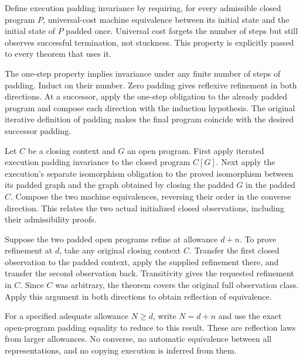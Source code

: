 Define execution padding invariance by requiring, for every admissible closed
program $P$, universal-cost machine equivalence between its initial state and
the initial state of $P$ padded once. Universal cost forgets the number of
steps but still observes successful termination, not stuckness. This property
is explicitly passed to every theorem that uses it.

The one-step property implies invariance under any finite number of steps of
padding. Induct on their number. Zero padding gives reflexive refinement in
both directions. At a successor, apply the one-step obligation to the already
padded program and compose each direction with the induction hypothesis. The
original iterative definition of padding makes the final program coincide
with the desired successor padding.




Let $C$ be a closing context and $G$ an open program. First apply iterated
execution padding invariance to the closed program $C[G]$. Next apply the
execution's separate isomorphism obligation to the proved isomorphism between
its padded graph and the graph obtained by closing the padded $G$ in the
padded $C$. Compose the two machine equivalences, reversing their order in
the converse direction. This relates the two actual initialized closed
observations, including their admissibility proofs.



Suppose the two padded open programs refine at allowance $d+n$. To prove
refinement at $d$, take any original closing context $C$. Transfer the first
closed observation to the padded context, apply the supplied refinement there,
and transfer the second observation back. Transitivity gives the requested
refinement in $C$. Since $C$ was arbitrary, the theorem covers the original
full observation class. Apply this argument in both directions to obtain
reflection of equivalence.

For a specified adequate allowance $N\geq d$, write $N=d+n$ and use the exact
open-program padding equality to reduce to this result. These are reflection
laws from larger allowances. No converse, no automatic equivalence between
all representations, and no copying execution is inferred from them.


